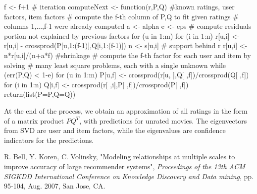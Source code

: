 \documentclass{article}
\begin{document}
f <- f+1 # iteration
computeNext <- function(r,P,Q){ #known ratings, user factors, item factors
	# compute the f-th column of P,Q to fit given ratings
	# columns 1,...,f-1 were already computed
	a <- alpha
	e <- eps
	# compute residuals portion not explained by previous factors
	for (u in 1:m){
		for (i in 1:n){
			r[u,i] <- r[u,i] - crossprod(P[u,1:(f-1)],Q[i,1:(f-1)])
			n <- s[u,i] # support behind r
			r[u,i] <- n*r[u,i]/(n+a*f) #shrinkage
		}
	}
	# compute the f-th factor for each user and item by solving
	# many least square problems, each with a single unknown
	while (err(P,Q) < 1-e){
		for (u in 1:m){
			P[u,f] <- crossprod(r[u, ],Q[ ,f])/crossprod(Q[ ,f])
		}
		for (i in 1:n){
			Q[i,f] <- crossprod(r[ ,i],P[ ,f])/crossprod(P[ ,f])
		}
	}
	return(list(P=P,Q=Q))
}

At the end of the process, we obtain an approximation of all ratings in the form of a matrix product
$PQ^T$, with predictions for unrated movies. The eigenvectors from SVD are user and item factors, while
the eigenvalues are confidence indicators for the predictions.

\begin{thebibliography}{9}
 R. Bell, Y. Koren, C. Volinsky, 
"Modeling relationships at multiple scales to improve accuracy of large recommender systems",
\textit{Proceedings of the 13th ACM SIGKDD International Conference on Knowledge Discovery and Data mining},
pp. 95-104, Aug. 2007, San Jose, CA.
\end{thebibliography}
\end{document}
